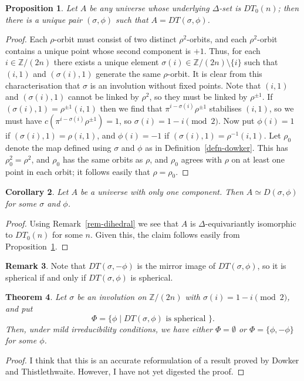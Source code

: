 \documentclass{amsart}
\newcommand{\Z}         {{\mathbb{Z}}}
\newcommand{\sm}        {\setminus}
\newcommand{\st}        {\;|\;}
\newcommand{\Dl}        {\Delta}
\newcommand{\sg}        {\sigma}
\renewcommand{\:}{\colon}
\newtheorem{theorem}{Theorem}[section]
\newtheorem{proposition}[theorem]{Proposition}
\newtheorem{corollary}[theorem]{Corollary}
\theoremstyle{definition}
\newtheorem{remark}[theorem]{Remark}
\begin{document}
\begin{proposition}\label{prop-dowker-b}
 Let $A$ be any universe whose underlying $\Dl$-set is $DT_0(n)$; then
 there is a unique pair $(\sg,\phi)$ such that $A=DT(\sg,\phi)$.
\end{proposition}
\begin{proof}
 Each $\rho$-orbit must consist of two distinct $\rho^2$-orbits, and
 each $\rho^2$-orbit contains a unique point whose second component is
 $+1$.  Thus, for each $i\in\Z/(2n)$ there exists a unique element
 $\sg(i)\in\Z/(2n)\sm\{i\}$ such that $(i,1)$ and $(\sg(i),1)$
 generate the same $\rho$-orbit.  It is clear from this
 characterisation that $\sg$ is an involution without fixed points.
 Note that $(i,1)$ and $(\sg(i),1)$ cannot be linked by $\rho^2$, so
 they must be linked by $\rho^{\pm 1}$.  If
 $(\sg(i),1)=\rho^{\pm 1}(i,1)$ then we find that
 $\pi^{i-\sg(i)}\rho^{\pm 1}$ stabilises $(i,1)$, so we must have
 $c(\pi^{i-\sg(i)}\rho^{\pm 1})=1$, so $\sg(i)=1-i\pmod{2}$.  Now put
 $\phi(i)=1$ if $(\sg(i),1)=\rho(i,1)$, and $\phi(i)=-1$ if
 $(\sg(i),1)=\rho^{-1}(i,1)$.  Let $\rho_0$ denote the map defined
 using $\sg$ and $\phi$ as in Definition~\ref{defn-dowker}.  This has
 $\rho_0^2=\rho^2$, and $\rho_0$ has the same orbits as $\rho$, and
 $\rho_0$ agrees with $\rho$ on at least one point in each orbit; it
 follows easily that $\rho=\rho_0$.
\end{proof}

\begin{corollary}
 Let $A$ be a universe with only one component.  Then
 $A\simeq D(\sg,\phi)$ for some $\sg$ and $\phi$.
\end{corollary}
\begin{proof}
 Using Remark~\ref{rem-dihedral} we see that $A$ is
 $\Dl$-equivariantly isomorphic to $DT_0(n)$ for some $n$.  Given
 this, the claim follows easily from Proposition~\ref{prop-dowker-b}. 
\end{proof}

\begin{remark}
 Note that $DT(\sg,-\phi)$ is the mirror image of $DT(\sg,\phi)$, so
 it is spherical if and only if $DT(\sg,\phi)$ is spherical.
\end{remark}

\begin{theorem}
 Let $\sg$ be an involution on $\Z/(2n)$ with $\sg(i)=1-i\pmod{2}$,
 and put 
 \[ \Phi = \{\phi\st DT(\sg,\phi) \text{ is spherical }\}. \]
 Then, under mild irreducibility conditions, we have either
 $\Phi=\emptyset$ or $\Phi=\{\phi,-\phi\}$ for some $\phi$.
\end{theorem}
\begin{proof}
 I think that this is an accurate reformulation of a result proved by
 Dowker and Thistlethwaite.  However, I have not yet digested the proof.
\end{proof}
\end{document}
